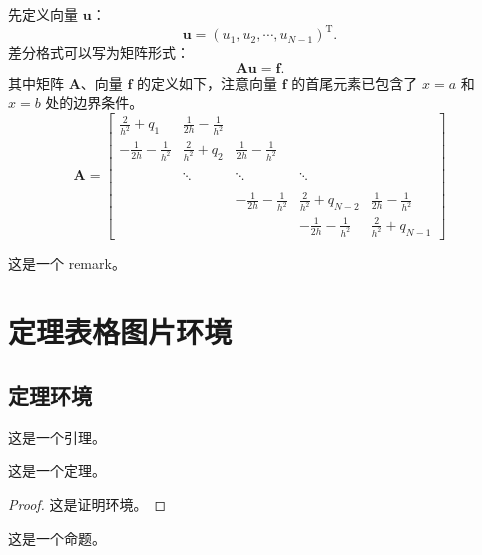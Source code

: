 \documentclass{shnuthesis}
\begin{document}
先定义向量 $\boldsymbol{u}$：
$$\boldsymbol{u}=(u_{1}, u_{2}, \cdots, u_{N-1})^{\mathrm{T}}.$$
差分格式可以写为矩阵形式：
$$\boldsymbol{A}\boldsymbol{u}=\boldsymbol{f}.
$$
其中矩阵 $\boldsymbol{A}$、向量 $\boldsymbol{f}$ 的定义如下，注意向量 $\boldsymbol{f}$ 的首尾元素已包含了 $x=a$ 和 $x=b$ 处的边界条件。
\begin{equation}\label{equ:matrix}
\boldsymbol{A}=\left[\begin{array}{cccccc}
\displaystyle \frac{2}{h^{2}}+q_{1} & \displaystyle\frac{1}{2h}-\frac{1}{h^{2}} &   &  &  \\[8pt]
 \displaystyle-\frac{1}{2h}-\frac{1}{h^{2}} & \displaystyle \frac{2}{h^{2}}+q_{2} & \displaystyle\frac{1}{2h}-\frac{1}{h^{2}}  & &  \\[8pt]
  &  &  &  &    \\
   &  \ddots  & \ddots  &   \ddots  &    \\[8pt]
   &  &  &  &    \\
  &   & \displaystyle-\frac{1}{2h}-\frac{1}{h^{2}} & \displaystyle\frac{2}{h^{2}}+q_{N-2}& \displaystyle\frac{1}{2h}-\frac{1}{h^{2}} \\[8pt]
  &  &  & \displaystyle-\frac{1}{2h}-\frac{1}{h^{2}} & \displaystyle \frac{2}{h^{2}}+q_{N-1}
\end{array}\right]
\end{equation}


\begin{remark}\label{rem1}
这是一个 remark。
\end{remark}


\chapter{定理表格图片环境}

\section{定理环境}

\begin{lemma}[Lemma]
这是一个引理。
\end{lemma}


\begin{theorem}[Theorem]
这是一个定理。
\end{theorem}
\begin{proof}
这是证明环境。
\end{proof}

\begin{proposition}[Proposition]
这是一个命题。
\end{proposition}
\end{document}
